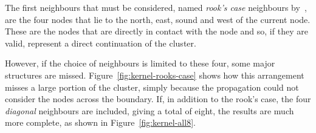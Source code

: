The first neighbours that must be considered, named \emph{rook's case}
neighbours by~\cite{abel1990comparative}, are the four nodes that lie to the
north, east, sound and west of the current node. These are the nodes that are
directly in contact with the node and so, if they are valid, represent a direct
continuation of the cluster.

However, if the choice of neighbours is limited to these four, some major
structures are missed. Figure~\ref{fig:kernel-rooks-case} shows how this
arrangement misses a large portion of the cluster, simply because the
propagation could not consider the nodes across the boundary. If, in addition
to the rook's case, the four \emph{diagonal} neighbours are included, giving a
total of eight, the results are much more complete, as shown in
Figure~\ref{fig:kernel-all8}.

